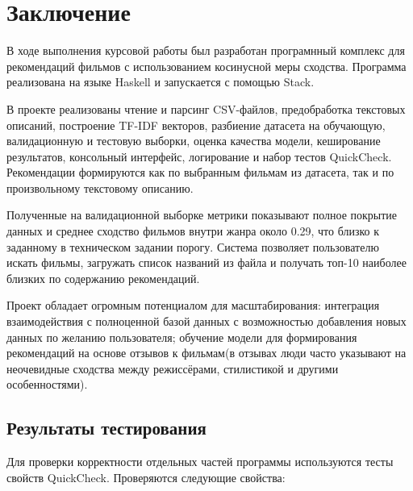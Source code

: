 \documentclass[a4paper, 16pt]{article}
\begin{document}
\section*{Заключение}

В ходе выполнения курсовой работы был разработан програмнный комплекс для рекомендаций фильмов с 
использованием косинусной меры сходства. Программа реализована на языке Haskell и запускается с помощью Stack.

В проекте реализованы чтение и парсинг CSV-файлов, предобработка текстовых описаний, 
построение TF-IDF векторов, разбиение датасета на обучающую, валидационную и тестовую выборки, 
оценка качества модели, кеширование результатов, консольный интерфейс, логирование и набор тестов QuickCheck. 
Рекомендации формируются как по выбранным фильмам из датасета, так и по произвольному текстовому описанию.

Полученные на валидационной выборке метрики показывают полное покрытие данных и среднее 
сходство фильмов внутри жанра около 0.29, что близко к заданному в техническом задании порогу. 
Система позволяет пользователю искать фильмы, загружать список названий из файла и получать топ-10 наиболее 
близких по содержанию рекомендаций.

Проект обладает огромным потенциалом для масштабирования: интеграция взаимодействия с полноценной базой данных с 
возможностью добавления новых данных по желанию пользователя; обучение модели для формирования рекомендаций на основе отзывов к 
фильмам(в отзывах люди часто указывают на неочевидные сходства между режиссёрами, стилистикой и другими особенностями).
\subsection{Результаты тестирования}

Для проверки корректности отдельных частей программы используются тесты свойств QuickCheck. Проверяются следующие свойства:
\end{document}
